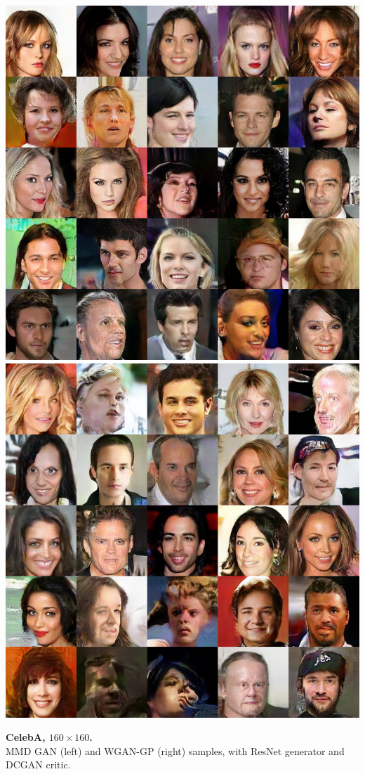 \documentclass[xcolor={table}]{beamer}
\begin{document}
\begin{frame}{}
\begin{columns}[T, totalwidth=\textwidth]
\begin{column}{.32\textwidth}
    \begin{minipage}{.6\linewidth}
      \includegraphics[width=.49\linewidth]{samples/celeba-mmd-rq-25.png}
      \includegraphics[width=.49\linewidth]{samples/celeba-wgan-25.png}
    \end{minipage}
    \begin{minipage}{.39\linewidth}
      \textbf{CelebA, $160 \times 160$.} \\
      MMD GAN (left) and WGAN-GP (right) samples,
      with ResNet generator and DCGAN critic.
    \end{minipage}
    \\[.5ex]


\end{column}
\end{columns}
\end{frame}
\end{document}
